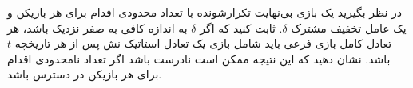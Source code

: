 در نظر بگیرید یک بازی بی‌نهایت تکرارشونده با تعداد محدودی اقدام برای هر بازیکن و یک عامل تخفیف مشترک
$\delta$.
ثابت کنید که اگر 
$\delta$
 به اندازه کافی به صفر نزدیک باشد، هر تعادل کامل بازی فرعی باید شامل بازی یک تعادل استاتیک نش پس از هر تاریخچه $t$ باشد. نشان دهید که این نتیجه ممکن است نادرست باشد اگر تعداد نامحدودی اقدام برای هر بازیکن در دسترس باشد.